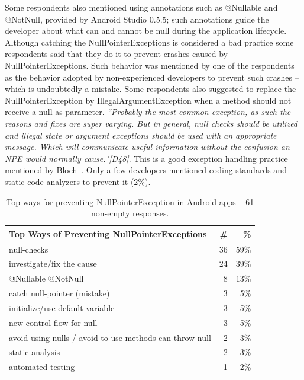 Some respondents also mentioned using annotations such as @Nullable and @NotNull, provided by Android Studio 0.5.5; such annotations guide the developer about what can and cannot be null during the application lifecycle. Although catching the NullPointerExceptions is considered a bad practice some respondents said that they do it to prevent crashes caused by NullPointerExceptions. Such behavior was mentioned by one of the respondents as the behavior adopted by non-experienced developers  to prevent such crashes -- which is undoubtedly a mistake. Some respondents also suggested to replace the NullPointerException by IllegalArgumentException when a method should not receive a null as parameter. \emph{``Probably the most common exception, as such the reasons and fixes are super varying. But in general, null checks should be utilized and illegal state or argument exceptions should be used with an appropriate message. Which will communicate useful information without the confusion an NPE would normally cause."[D48]}. This is a good exception handling practice mentioned by Bloch~\cite{bloch2008effective}. Only a few developers mentioned coding standards and static code analyzers to prevent it (2\%).



\begin{table}
\scriptsize
\centering
\begin{tabular}{lrr}
\hline
\bfseries{Top Ways of Preventing NullPointerExceptions} & \bfseries{\#} & \bfseries{\%} \\
\hline
null-checks &	36 &	59\% \\
investigate/fix the cause	& 24 & 	39\% \\
@Nullable @NotNull &	8 &	13\% \\
catch null-pointer (mistake)	& 3 &	5\% \\
initialize/use default variable	& 3 &	5\% \\
new control-flow for null	& 3 &	5\% \\
avoid using nulls / avoid to use methods can throw null	& 2 &	3\% \\
static analysis	& 2 &	3\% \\
automated testing	& 1 &	2\% \\
\hline
\end{tabular}
\caption{Top ways for preventing NullPointerException in Android apps -- 61 non-empty responses. }
\label{tab:preventnull}
\end{table}	


